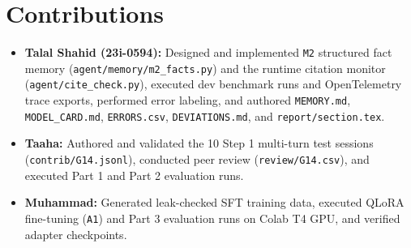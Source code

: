 \documentclass[11pt]{article}
\begin{document}
\section*{Contributions}
\begin{itemize}[leftmargin=*,nosep]
    \item \textbf{Talal Shahid (23i-0594):} Designed and implemented \texttt{M2} structured fact memory (\texttt{agent/memory/m2\_facts.py}) and the runtime citation monitor (\texttt{agent/cite\_check.py}), executed dev benchmark runs and OpenTelemetry trace exports, performed error labeling, and authored \texttt{MEMORY.md}, \texttt{MODEL\_CARD.md}, \texttt{ERRORS.csv}, \texttt{DEVIATIONS.md}, and \texttt{report/section.tex}.
    \item \textbf{Taaha:} Authored and validated the 10 Step 1 multi-turn test sessions (\texttt{contrib/G14.jsonl}), conducted peer review (\texttt{review/G14.csv}), and executed Part 1 and Part 2 evaluation runs.
    \item \textbf{Muhammad:} Generated leak-checked SFT training data, executed QLoRA fine-tuning (\texttt{A1}) and Part 3 evaluation runs on Colab T4 GPU, and verified adapter checkpoints.
\end{itemize}
\end{document}

